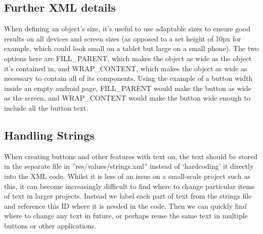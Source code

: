 \subsection{Further XML details}
When defining an object’s size, it’s useful to use adaptable sizes to ensure good results on all devices and screen sizes (as opposed to a set height of 10px for example, which could look small on a tablet but large on a small phone). The two options here are FILL\_PARENT, which makes the object as wide as the object it’s contained in, and WRAP\_CONTENT, which makes the object as wide as necessary to contain all of its components. Using the example of a button width inside an empty android page, FILL\_PARENT would make the button as wide as the screen, and WRAP\_CONTENT would make the button wide enough to include all the button text.
\subsection{Handling Strings}
When creating buttons and other features with text on, the text should be stored in the separate file in ''res/values/strings.xml'' instead of ‘hardcoding’ it directly into the XML code. Whilst it is less of an issue on a small-scale project such as this, it can become increasingly difficult to find where to change particular items of text in larger projects. Instead we label each part of text from the strings file and reference this ID where it is needed in the code. Then we can quickly find where to change any text in future, or perhaps reuse the same text in multiple buttons or other applications.
